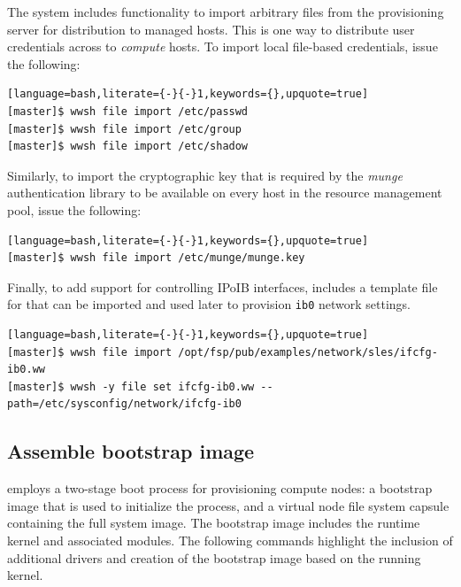 \documentclass[letterpaper]{article}
\begin{document}
The \Warewulf{} system includes functionality to import arbitrary files from the
provisioning server for distribution to managed hosts. This is one way
to distribute user credentials across to {\em compute} hosts. To
import local file-based credentials, issue the following:

\begin{lstlisting}[language=bash,literate={-}{-}1,keywords={},upquote=true]
[master]$ wwsh file import /etc/passwd                                                          
[master]$ wwsh file import /etc/group
[master]$ wwsh file import /etc/shadow 
\end{lstlisting}

\newpage
Similarly, to import the cryptographic key that is required by the {\em munge}
authentication library to be available on every host in the resource management
pool, issue the following:

\begin{lstlisting}[language=bash,literate={-}{-}1,keywords={},upquote=true]
[master]$ wwsh file import /etc/munge/munge.key
\end{lstlisting}

Finally, to add support for controlling IPoIB interfaces, \FSP{} includes a
template file for \Warewulf{} that can be imported and used later to provision
\texttt{ib0} network settings.

\begin{lstlisting}[language=bash,literate={-}{-}1,keywords={},upquote=true]
[master]$ wwsh file import /opt/fsp/pub/examples/network/sles/ifcfg-ib0.ww
[master]$ wwsh -y file set ifcfg-ib0.ww --path=/etc/sysconfig/network/ifcfg-ib0
\end{lstlisting}

\subsection{Assemble bootstrap image} \label{sec:assemble_bootstrap}

\Warewulf{} employs a two-stage boot process for provisioning compute nodes:
a bootstrap image that is used to initialize the process, and a virtual node 
file system capsule containing the full system image. The bootstrap image 
includes the runtime kernel and associated modules. The following commands 
highlight the inclusion of additional drivers and creation of the bootstrap 
image based on the running kernel.
\end{document}
